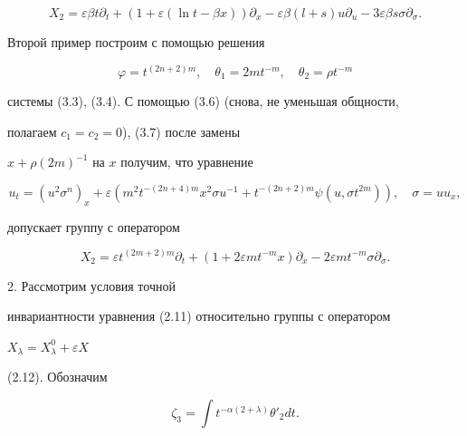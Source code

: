 \begin{equation}


X_2=\varepsilon\beta t\partial_t+(1+\varepsilon(\ln t-\beta x))


\partial_x-\varepsilon\beta(l+s)u\partial_u-


3\varepsilon\beta s\sigma\partial_\sigma. \tag{3.9}


\end{equation}


Второй пример построим с помощью решения


$$


\varphi=t^{(2n+2)m},\quad \theta_1=2mt^{-m},\quad


\theta_2=\rho t^{-m}


$$


системы (3.3), (3.4). С помощью (3.6) (снова, не уменьшая общности,


полагаем $c_1=c_2=0$), (3.7) после замены


$x+\rho(2m)^{-1}$ на $x$ получим, что уравнение


\begin{equation}


u_t=(u^2\sigma^n)_x+\varepsilon(m^2t^{-(2n+4)m}x^2\sigma u^{-1}+


t^{-(2n+2)m}\psi(u,\sigma t^{2m})),\quad \sigma=uu_x, \tag{3.10}


\end{equation}


допускает группу с оператором


\begin{equation}


X_2=\varepsilon t^{(2m+2)m}\partial_t+


(1+2\varepsilon mt^{-m}x)\partial_x-2\varepsilon mt^{-m}


\sigma\partial_\sigma. \tag{3.11}


\end{equation}





2. Рассмотрим условия точной


инвариантности уравнения (2.11) относительно группы с оператором


$X_\lambda=X^0_\lambda+\varepsilon X$


(2.12). Обозначим


$$


\zeta_3=\int t^{-\alpha(2+\lambda)}\theta'_2 dt.


$$


